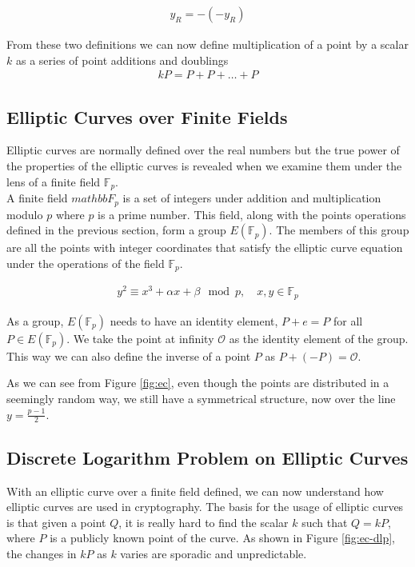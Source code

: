 \begin{gather}
    y_R = -(-y_R)
\end{gather}

From these two definitions we can now define multiplication of a point by a scalar $k$ as a series of point additions and doublings
\begin{gather}
    kP = P + P + \ldots + P
\end{gather}

\subsection{Elliptic Curves over Finite Fields}

Elliptic curves are normally defined over the real numbers but the true power of the properties of the elliptic curves is revealed when we examine them under the lens of a finite field $\mathbb{F}_p$.
\\

A finite field $mathbb{F}_p$ is a set of integers under addition and multiplication modulo $p$ where $p$ is a prime number. This field, along with the points operations defined in the previous section, form a group $E(\mathbb{F}_p)$. The members of this group are all the points with integer coordinates that satisfy the elliptic curve equation under the operations of the field $\mathbb{F}_p$.

\begin{gather}
    y^2 \equiv x^3 + \alpha x + \beta \mod p, \quad x, y \in \mathbb{F}_p
\end{gather}

As a group, $E(\mathbb{F}_p)$ needs to have an identity element, $P + e = P$ for all $P \in E(\mathbb{F}_p)$. We take the point at infinity $\mathcal{O}$ as the identity element of the group. This way we can also define the inverse of a point $P$ as $P + (-P) = \mathcal{O}$.


As we can see from Figure \ref{fig:ec}, even though the points are distributed in a seemingly random way, we still have a symmetrical structure, now over the line $y = \frac{p - 1}{2}$.

\subsection{Discrete Logarithm Problem on Elliptic Curves}
With an elliptic curve over a finite field defined, we can now understand how elliptic curves are used in cryptography. The basis for the usage of elliptic curves is that given a point $Q$, it is really hard to find the scalar $k$ such that $Q = kP$, where $P$ is a publicly known point of the curve. As shown in Figure \ref{fig:ec-dlp}, the changes in $kP$ as $k$ varies are sporadic and unpredictable.

